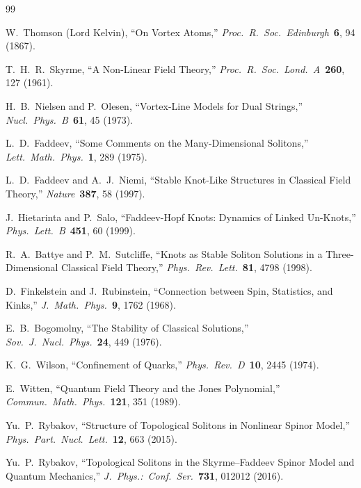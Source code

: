 \documentclass[11pt]{article}
\begin{document}
\begin{thebibliography}{99}

W.~Thomson (Lord Kelvin),
``On Vortex Atoms,''
\emph{Proc.\ R.\ Soc.\ Edinburgh}\ \textbf{6}, 94 (1867).

T.~H.~R.~Skyrme,
``A Non-Linear Field Theory,''
\emph{Proc.\ R.\ Soc.\ Lond.\ A}\ \textbf{260}, 127 (1961).

H.~B.~Nielsen and P.~Olesen,
``Vortex-Line Models for Dual Strings,''
\emph{Nucl.\ Phys.\ B}\ \textbf{61}, 45 (1973).

L.~D.~Faddeev,
``Some Comments on the Many-Dimensional Solitons,''
\emph{Lett.\ Math.\ Phys.}\ \textbf{1}, 289 (1975).

L.~D.~Faddeev and A.~J.~Niemi,
``Stable Knot-Like Structures in Classical Field Theory,''
\emph{Nature}\ \textbf{387}, 58 (1997).

J.~Hietarinta and P.~Salo,
``Faddeev-Hopf Knots: Dynamics of Linked Un-Knots,''
\emph{Phys.\ Lett.\ B}\ \textbf{451}, 60 (1999).

R.~A.~Battye and P.~M.~Sutcliffe,
``Knots as Stable Soliton Solutions in a Three-Dimensional
Classical Field Theory,''
\emph{Phys.\ Rev.\ Lett.}\ \textbf{81}, 4798 (1998).

D.~Finkelstein and J.~Rubinstein,
``Connection between Spin, Statistics, and Kinks,''
\emph{J.\ Math.\ Phys.}\ \textbf{9}, 1762 (1968).

E.~B.~Bogomolny,
``The Stability of Classical Solutions,''
\emph{Sov.\ J.\ Nucl.\ Phys.}\ \textbf{24}, 449 (1976).

K.~G.~Wilson,
``Confinement of Quarks,''
\emph{Phys.\ Rev.\ D}\ \textbf{10}, 2445 (1974).

E.~Witten,
``Quantum Field Theory and the Jones Polynomial,''
\emph{Commun.\ Math.\ Phys.}\ \textbf{121}, 351 (1989).


Yu.~P.~Rybakov,
``Structure of Topological Solitons in Nonlinear Spinor Model,''
\emph{Phys.\ Part.\ Nucl.\ Lett.}\ \textbf{12}, 663 (2015).

Yu.~P.~Rybakov,
``Topological Solitons in the Skyrme--Faddeev Spinor Model and
Quantum Mechanics,''
\emph{J.\ Phys.:\ Conf.\ Ser.}\ \textbf{731}, 012012 (2016).


\end{thebibliography}
\end{document}
